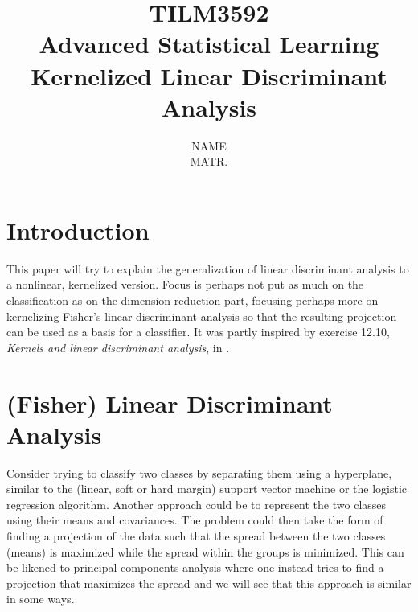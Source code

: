 \documentclass[a4paper, 12pt]{scrartcl}
\title{{\Large \textbf{TILM3592\\Advanced Statistical Learning}}\\
	{\LARGE \textbf{Kernelized Linear Discriminant Analysis}}\\}
\author{{\large NAME}\\
{ MATR.}}
\date{}
\begin{document}
\maketitle

\section{Introduction}
This paper will try to explain the generalization of linear discriminant analysis to a nonlinear, kernelized version. Focus is perhaps not put as much on the classification as on the dimension-reduction part, focusing perhaps more on kernelizing Fisher's linear discriminant analysis so that the resulting projection can be used as a basis for a classifier. It was partly inspired by exercise 12.10, \emph{Kernels and linear discriminant analysis}, in \cite{ESL}.


\section{(Fisher) Linear Discriminant Analysis}
Consider trying to classify two classes by separating them using a hyperplane, similar to the (linear, soft or hard margin) support vector machine or the logistic regression algorithm. Another approach could be to represent the two classes using their means and covariances. The problem could then take the form of finding a projection of the data such that the spread between the two classes (means) is maximized while the spread within the groups is minimized. This can be likened to principal components analysis where one instead tries to find a projection that maximizes the spread and we will see that this approach is similar in some ways.
\end{document}

